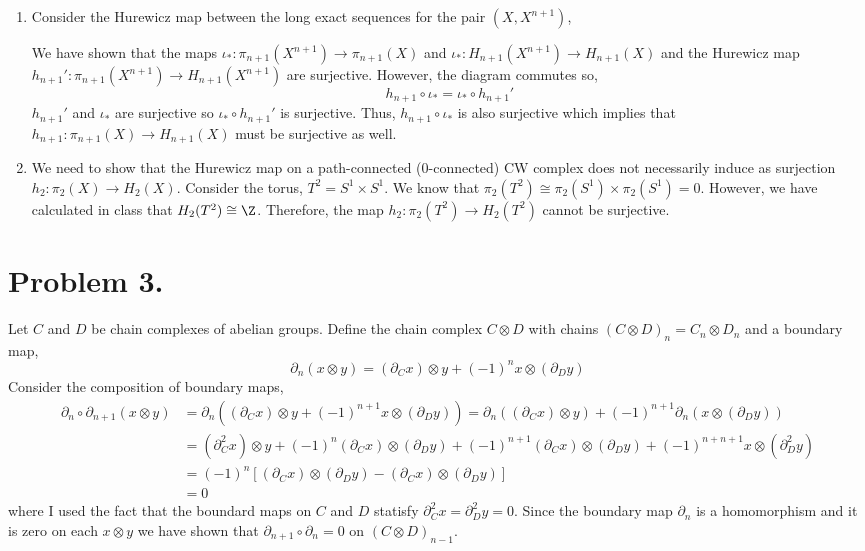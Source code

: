 \documentclass[12pt]{extarticle}
\begin{document}
\begin{enumerate}
\item Consider the Hurewicz map between the long exact sequences for the pair $(X, X^{n+1})$,
\begin{center}
\end{center}
We have shown that the maps $\iota_* : \pi_{n+1}(X^{n+1}) \to \pi_{n+1}(X)$ and $\iota_* : H_{n+1}(X^{n+1}) \to H_{n+1}(X)$ and the Hurewicz map $h_{n+1}' : \pi_{n+1}(X^{n+1}) \to H_{n+1}(X^{n+1})$ are surjective. However, the diagram commutes so,
\[ h_{n+1} \circ \iota_* = \iota_* \circ h_{n+1}' \]
 $h_{n+1}'$ and $\iota_*$ are surjective so $\iota_* \circ h_{n+1}'$ is surjective. Thus, $h_{n+1} \circ \iota_*$ is also surjective which implies that $h_{n+1} : \pi_{n+1}(X) \to H_{n+1}(X)$ must be surjective as well. 

\item We need to show that the Hurewicz map on a path-connected ($0$-connected) CW complex does not necessarily induce as surjection $h_2 : \pi_2(X) \to H_2(X)$. Consider the torus, $T^2 = S^1 \times S^1$. We know that $\pi_2(T^2) \cong \pi_2(S^1) \times \pi_2(S^1) = 0$. However, we have calculated in class that $H_2(T^2) \cong \Z$. Therefore, the map $h_2 : \pi_2(T^2) \to H_2(T^2)$ cannot be surjective. 
\end{enumerate}

\section*{Problem 3.}
Let $C$ and $D$ be chain complexes of abelian groups. Define the chain complex $C \otimes D$ with chains $(C \otimes D)_n = C_n \otimes D_n$ and a boundary map,
\[ \partial_n (x \otimes y) = (\partial_C x) \otimes y + (-1)^n x \otimes ( \partial_D y) \]
Consider the composition of boundary maps,
\begin{align*}
\partial_{n} \circ \partial_{n+1} (x \otimes y) & = \partial_{n} \left( (\partial_C x) \otimes y + (-1)^{n+1} x \otimes ( \partial_D y) \right) = \partial_{n} ((\partial_C x) \otimes y) + (-1)^{n+1} \partial_{n} (x \otimes ( \partial_D y)) 
\\
& = (\partial^2_C x) \otimes y + (-1)^{n} (\partial_C x) \otimes (\partial_D y) + (-1)^{n+1} (\partial_C x) \otimes ( \partial_D y) + (-1)^{n + n + 1} x \otimes ( \partial^2_D y)  
\\
& = (-1)^{n} \left[ (\partial_C x) \otimes (\partial_D y) - (\partial_C x) \otimes ( \partial_D y) \right]
\\
& = 0
\end{align*}
where I used the fact that the boundard maps on $C$ and $D$ statisfy $\partial_C^2 x = \partial_D^2 y = 0$. Since the boundary map $\partial_n$ is a homomorphism and it is zero on each $x \otimes y$ we have shown that $\partial_{n+1} \circ \partial_n = 0$ on $(C \otimes D)_{n-1}$.
\end{document}

